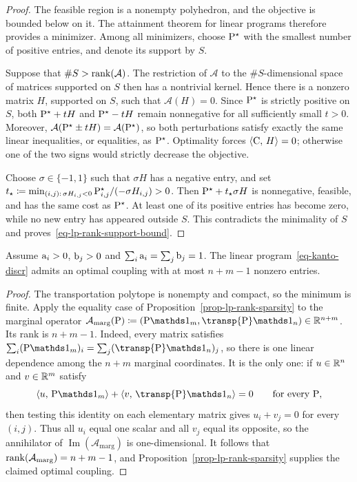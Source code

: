 \begin{proof}
	The feasible region is a nonempty polyhedron, and the objective is bounded below on it. The attainment theorem for linear programs therefore provides a minimizer. Among all minimizers, choose $\P^\star$ with the smallest number of positive entries, and denote its support by $S$.

	Suppose that $\#S>\rank(\mathcal A)$. The restriction of $\mathcal A$ to the $\#S$-dimensional space of matrices supported on $S$ then has a nontrivial kernel. Hence there is a nonzero matrix $H$, supported on $S$, such that $\mathcal A(H)=0$. Since $\P^\star$ is strictly positive on $S$, both $\P^\star+tH$ and $\P^\star-tH$ remain nonnegative for all sufficiently small $t>0$. Moreover, $\mathcal A(\P^\star\pm tH)=\mathcal A(\P^\star)$, so both perturbations satisfy exactly the same linear inequalities, or equalities, as $\P^\star$. Optimality forces $\dotp{\C}{H}=0$; otherwise one of the two signs would strictly decrease the objective.

	Choose $\sigma\in\{-1,1\}$ such that $\sigma H$ has a negative entry, and set $t_\star\eqdef\min_{(i,j):\,\sigma H_{i,j}<0}\P^\star_{i,j}/(-\sigma H_{i,j})>0$.
	Then $\P^\star+t_\star\sigma H$ is nonnegative, feasible, and has the same cost as $\P^\star$. At least one of its positive entries has become zero, while no new entry has appeared outside $S$. This contradicts the minimality of $S$ and proves~\eqref{eq-lp-rank-support-bound}.
\end{proof}

\begin{prop}\label{prop-sparse-optimal-plans}
	Assume $\a_i>0$, $\b_j>0$ and $\sum_i \a_i=\sum_j \b_j=1$. The linear program~\eqref{eq-kanto-discr} admits an optimal coupling with at most $n+m-1$ nonzero entries.
\end{prop}
\begin{proof}
	The transportation polytope is nonempty and compact, so the minimum is finite. Apply the equality case of Proposition~\ref{prop-lp-rank-sparsity} to the marginal operator $\mathcal A_{\mathrm{marg}}(\P)\eqdef(\P\ones_m,\transp{\P}\ones_n)\in\RR^{n+m}$.
	Its rank is $n+m-1$. Indeed, every matrix satisfies
	$\sum_i(\P\ones_m)_i=\sum_j(\transp{\P}\ones_n)_j$, so there is one linear dependence among the $n+m$ marginal coordinates. It is the only one: if $u\in\RR^n$ and $v\in\RR^m$ satisfy
	\[
		\dotp{u}{\P\ones_m}
		+
		\dotp{v}{\transp{\P}\ones_n}=0
		\qquad\text{for every }\P,
	\]
	then testing this identity on each elementary matrix gives $u_i+v_j=0$ for every $(i,j)$. Thus all $u_i$ equal one scalar and all $v_j$ equal its opposite, so the annihilator of $\operatorname{Im}(\mathcal A_{\mathrm{marg}})$ is one-dimensional. It follows that $\rank(\mathcal A_{\mathrm{marg}})=n+m-1$, and Proposition~\ref{prop-lp-rank-sparsity} supplies the claimed optimal coupling.
\end{proof}

